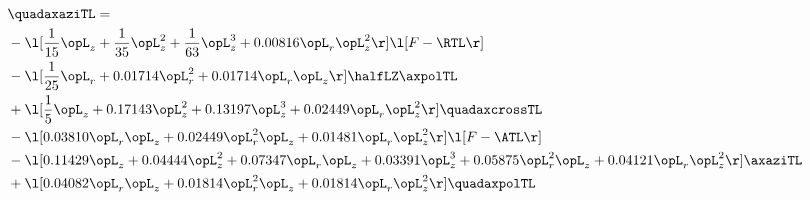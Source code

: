\begin{alignat}{2} 
\label{eq:quadaxaziTL_1} 
& \quadaxaziTL = \\ 
& - \l[ \frac{1}{15} \opL_z + \frac{1}{35} \opL_z^{2} + \frac{1}{63} \opL_z^{3} +  0.00816 \opL_r \opL_z^{2}  \r] \l[ F - \RTL \r] \nonumber \\ 
& - \l[ \frac{1}{25} \opL_r +  0.01714 \opL_r^{2} +  0.01714 \opL_r \opL_z  \r] \halfLZ \axpolTL \nonumber \\ 
& + \l[ \frac{1}{5} \opL_z +  0.17143 \opL_z^{2} +  0.13197 \opL_z^{3} +  0.02449 \opL_r \opL_z^{2}  \r] \quadaxcrossTL \nonumber \\ 
& - \l[  0.03810 \opL_r \opL_z +  0.02449 \opL_r^{2} \opL_z +  0.01481 \opL_r \opL_z^{2}  \r] \l[ F - \ATL \r] \nonumber \\ 
& - \l[  0.11429 \opL_z +  0.04444 \opL_z^{2} +  0.07347 \opL_r \opL_z +  0.03391 \opL_z^{3} +  0.05875 \opL_r^{2} \opL_z +  0.04121 \opL_r \opL_z^{2}  \r] \axaziTL \nonumber \\ 
& + \l[  0.04082 \opL_r \opL_z +  0.01814 \opL_r^{2} \opL_z +  0.01814 \opL_r \opL_z^{2}  \r] \quadaxpolTL \nonumber \\ 
\end{alignat} 


